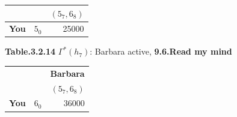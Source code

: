 \documentclass{article}
\begin{document}
\begin{description}
\begin{center}
\begin{tabular}{rrr}
                   &            &  $(5_7,6_8)$ \\
        \hline
         {\bf You} &        $5_0$ &      25000 \\
        \hline
        \hline
        \end{tabular}

         {\bf Table.3.2.14 }$\Gamma ^{*}(h_7)$: Barbara active, {\bf 9.6.Read my mind}
    \end{center}
    \begin{center}
        \begin{tabular}{rrr}
        \hline
        \hline
                   &            & {\bf Barbara} \\

                   &            &  $(5_7,6_8)$ \\
        \hline
         {\bf You} &        $6_0$ &      36000 \\
        \hline
        \hline
        \end{tabular}


\end{center}
\end{description}
\end{document}
